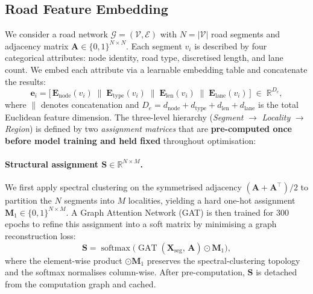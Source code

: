 \subsection{Road Feature Embedding}\label{subsec:feat_embed}

We consider a road network $\mathcal{G} = (\mathcal{V}, \mathcal{E})$
with $N = |\mathcal{V}|$ road segments and adjacency matrix $\mathbf{A} \in \{0,1\}^{N \times N}$.
Each segment $v_i$ is described by four categorical attributes:
node identity, road type, discretised length, and lane count.
We embed each attribute via a learnable embedding table and concatenate the results:
\begin{equation}\label{eq:raw_feat}
  \mathbf{e}_i
  = \bigl[\,
      \mathbf{E}_{\text{node}}(v_i) \;\|\;
      \mathbf{E}_{\text{type}}(v_i) \;\|\;
      \mathbf{E}_{\text{len}}(v_i)  \;\|\;
      \mathbf{E}_{\text{lane}}(v_i)
    \,\bigr]
  \;\in\; \mathbb{R}^{D_e},
\end{equation}
where $\|$ denotes concatenation and $D_e = d_{\text{node}} + d_{\text{type}} + d_{\text{len}} + d_{\text{lane}}$ is the total Euclidean feature dimension.
The three-level hierarchy (\emph{Segment} $\rightarrow$ \emph{Locality} $\rightarrow$ \emph{Region}) is defined by two \emph{assignment matrices} that are \textbf{pre-computed once before model training and held fixed} throughout optimisation:

\paragraph{Structural assignment $\mathbf{S} \in \mathbb{R}^{N \times M}$.}
We first apply spectral clustering on the symmetrised adjacency $(\mathbf{A} + \mathbf{A}^\top)/2$ to partition the $N$ segments into $M$ localities, yielding a hard one-hot assignment $\mathbf{M}_1 \in \{0,1\}^{N \times M}$.
A Graph Attention Network (GAT) is then trained for 300 epochs to refine this assignment into a soft matrix by minimising a graph reconstruction loss:
\begin{equation}\label{eq:struct_assign}
  \mathbf{S} = \operatorname{softmax}\!\bigl(\operatorname{GAT}(\mathbf{X}_{\text{seg}},\, \mathbf{A}) \odot \mathbf{M}_1\bigr),
\end{equation}
where the element-wise product $\odot \mathbf{M}_1$ preserves the spectral-clustering topology and the softmax normalises column-wise.
After pre-computation, $\mathbf{S}$ is detached from the computation graph and cached.

